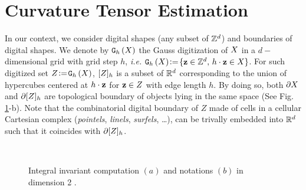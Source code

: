 \documentclass{llncs}
\begin{document}
\section{Curvature Tensor Estimation}
\label{sec:curv-tens-estim}

\sloppy In our context, we consider digital shapes (any subset of
${\mathbb{Z}}^d$) and boundaries of digital shapes. We denote by $\mathtt{G}_{h}\left(X\right)$ the
Gauss digitization of $X$ in a $d-$dimensional grid with grid
step $h$, \emph{i.e.}  $\mathtt{G}_{h}\left(X\right) \!\mathrel{\mathop:}=\! \{ \mathbf{z} \in {\mathbb{Z}}^d,\, h\cdot\mathbf{z}\in X\}$. For such
digitized set $Z\!\mathrel{\mathop:}=\!\mathtt{G}_{h}\left(X\right)$, $\lbrack Z \rbrack_{h}$ is a subset
of ${\mathbb{R}}^d$ corresponding to the union of hypercubes centered at $h\cdot
\mathbf{z}$ for $\mathbf{z}\in Z$ with edge length $h$. By doing so, both
$\partial X$ and $\partial\lbrack Z \rbrack_{h}$ are topological boundary of
objects lying in the same space (See Fig. \ref{fig:notations}-b). Note
that the combinatorial digital boundary of $Z$ made of cells in a
cellular Cartesian complex (\emph{pointels}, \emph{linels}, {\em
  surfels}, \ldots), can be trivally embedded into ${\mathbb{R}}^d$ such that it
coincides with $\partial\lbrack Z \rbrack_{h}$.


\begin{figure}[t]{\small
    \begin{center}
      ~~~~~~
      \vspace{-0.4cm}
    \end{center}}
    \caption{Integral invariant computation $(a)$ and
      notations $(b)$ in dimension 2 \cite{CVIU2014}.\label{fig:notations}}
\end{figure}
\end{document}
